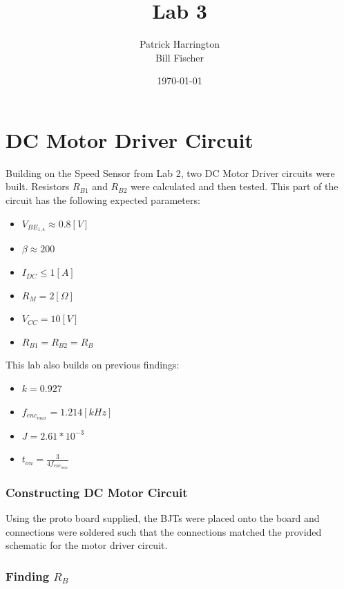 \documentclass{hw}
\title{Lab 3}
\author{Patrick Harrington\\ Bill Fischer}
\date{\today}
\begin{document}
\maketitle
{}

\part{DC Motor Driver Circuit}
Building on the Speed Sensor from Lab 2, two DC Motor Driver circuits were
built. Resistors $R_{B1}$ and $R_{B2}$ were calculated and then tested. This
part of the circuit has the following expected parameters:
\begin{itemize}
  \item $V_{BE_{1,4}}\approx0.8[V]$
  \item $\beta\approx200$
  \item $I_{DC}\leq1[A]$
\item $R_M=2[\Omega]$
  \item $V_{CC}=10[V]$
  \item $R_{B1}=R_{B2}=R_B$
  \end{itemize}
This lab also builds on previous findings:
\begin{itemize}
  \item $k=0.927$
  \item $f_{enc_{max}}=1.214[kHz]$
  \item $J=2.61*10^{-3}$
  \item $t_{on}=\frac{3}{4 f_{enc_{max}}}$
  \end{itemize}
\section{Constructing DC Motor Circuit}
Using the proto board supplied, the BJTs were placed onto the board and
connections were soldered such that the connections matched the provided
schematic for the motor driver circuit. 

\section{Finding $R_B$}
\end{document}
